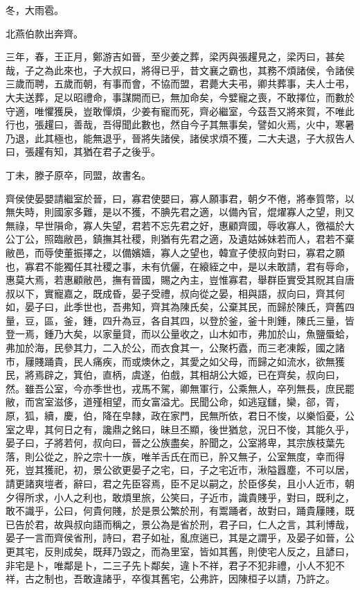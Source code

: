 \begin{pinyinscope}
冬，大雨雹。

北燕伯款出奔齊。

三年，春，王正月，鄭游吉如晉，至少姜之葬，梁丙與張趯見之，梁丙曰，甚矣哉，子之為此來也，子大叔曰，將得已乎，昔文襄之霸也，其務不煩諸侯，令諸侯三歲而聘，五歲而朝，有事而會，不協而盟，君薨大夫弔，卿共葬事，夫人士弔，大夫送葬，足以昭禮命，事謀闕而已，無加命矣，今嬖寵之喪，不敢擇位，而數於守適，唯懼獲戾，豈敢憚煩，少姜有寵而死，齊必繼室，今茲吾又將來賀，不唯此行也，張趯曰，善哉，吾得聞此數也，然自今子其無事矣，譬如火焉，火中，寒暑乃退，此其極也，能無退乎，晉將失諸侯，諸侯求煩不獲，二大夫退，子大叔告人曰，張趯有知，其猶在君子之後乎。

丁未，滕子原卒，同盟，故書名。

齊侯使晏嬰請繼室於晉，曰，寡君使嬰曰，寡人願事君，朝夕不倦，將奉質幣，以無失時，則國家多難，是以不獲，不腆先君之適，以備內官，焜燿寡人之望，則又無祿，早世隕命，寡人失望，君若不忘先君之好，惠顧齊國，辱收寡人，徼福於大公丁公，照臨敝邑，鎮撫其社稷，則猶有先君之適，及遺姑姊妹若而人，君若不棄敝邑，而辱使董振擇之，以備嬪嬙，寡人之望也，韓宣子使叔向對曰，寡君之願也，寡君不能獨任其社稷之事，未有伉儷，在縗絰之中，是以未敢請，君有辱命，惠莫大焉，若惠顧敝邑，撫有晉國，賜之內主，豈惟寡君，舉群臣實受其貺其自唐叔以下，實寵嘉之，既成昏，晏子受禮，叔向從之晏，相與語，叔向曰，齊其何如，晏子曰，此季世也，吾弗知，齊其為陳氏矣，公棄其民，而歸於陳氏，齊舊四量，豆，區，釜，鍾，四升為豆，各自其四，以登於釜，釜十則鍾，陳氏三量，皆登一焉，鍾乃大矣，以家量貸，而以公量收之，山木如市，弗加於山，魚鹽蜃蛤，弗加於海，民參其力，二入於公，而衣食其一，公聚朽蠹，而三老凍餒，國之諸市，屨賤踊貴，民人痛疾，而或燠休之，其愛之如父母，而歸之如流水，欲無獲民，將焉辟之，箕伯，直柄，虞遂，伯戲，其相胡公大姬，已在齊矣，叔向曰，然。雖吾公室，今亦季世也，戎馬不駕，卿無軍行，公乘無人，卒列無長，庶民罷敝，而宮室滋侈，道殣相望，而女富溢尤。民聞公命，如逃寇讎，欒，郤，胥，原，狐，續，慶，伯，降在皁隸，政在家門，民無所依，君日不悛，以樂慆憂，公室之卑，其何日之有，讒鼎之銘曰，昧旦丕顯，後世猶怠，況日不悛，其能久乎，晏子曰，子將若何，叔向曰，晉之公族盡矣，肸聞之，公室將卑，其宗族枝葉先落，則公從之，肸之宗十一族，唯羊舌氏在而已，肸又無子，公室無度，幸而得死，豈其獲祀，初，景公欲更晏子之宅，曰，子之宅近市，湫隘囂塵，不可以居，請更諸爽塏者，辭曰，君之先臣容焉，臣不足以嗣之，於臣侈矣，且小人近市，朝夕得所求，小人之利也，敢煩里旅，公笑曰，子近市，識貴賤乎，對曰，既利之，敢不識乎，公曰，何貴何賤，於是景公繁於刑，有鬻踊者，故對曰，踊貴屨賤，既已告於君，故與叔向語而稱之，景公為是省於刑，君子曰，仁人之言，其利博哉，晏子一言而齊侯省刑，詩曰，君子如祉，亂庶遄已，其是之謂乎，及晏子如晉，公更其宅，反則成矣，既拜乃毀之，而為里室，皆如其舊，則使宅人反之，且諺曰，非宅是卜，唯鄰是卜，二三子先卜鄰矣，違卜不祥，君子不犯非禮，小人不犯不祥，古之制也，吾敢違諸乎，卒復其舊宅，公弗許，因陳桓子以請，乃許之。


\end{pinyinscope}
